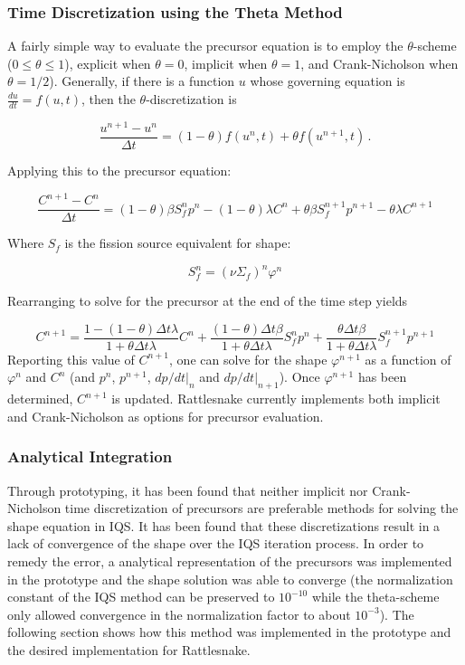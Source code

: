 \documentclass[12pt]{scrartcl}
\newcommand{\be}{\begin{equation}}
\newcommand{\ee}{\end{equation}}
\begin{document}
\subsubsection{Time Discretization using the Theta Method}

A fairly simple way to evaluate the precursor equation is to employ the $\theta$-scheme ($0\le\theta\le1$),
explicit when $\theta=0$, implicit when $\theta=1$, and Crank-Nicholson when $\theta=1/2$).
Generally, if there is a function $u$ whose governing equation is $\frac{du}{dt}=f(u,t)$,
then the $\theta$-discretization is

\be
\frac{u^{n+1}-u^n}{\Delta t}=(1-\theta)f(u^n,t) + \theta f(u^{n+1},t) \,.
\ee

Applying this to the precursor equation:

\be
\frac{C^{n+1}-C^n}{\Delta t}=(1-\theta)\beta S_f^np^n-(1-\theta)\lambda C^n + \theta\beta S_f^{n+1}p^{n+1}-\theta\lambda C^{n+1}
\ee

Where $S_f$ is the fission source equivalent for shape:

\be
S_f^n=(\nu\Sigma_f)^n\varphi^n
\ee

Rearranging to solve for the precursor at the end of the time step yields

\be
C^{n+1} = \frac{1-(1-\theta)\Delta t\lambda}{1+\theta\Delta t\lambda}C^n + \frac{(1-\theta)\Delta t \beta}{1+\theta\Delta t\lambda}S_f^n p^n +  \frac{\theta\Delta t \beta}{1+\theta\Delta t\lambda}S_f^{n+1} p^{n+1}
\ee
Reporting this value of $C^{n+1}$, one can solve for the shape $\varphi^{n+1}$ as a function of $\varphi^n$ and $C^n$
(and $p^n$, $p^{n+1}$, $dp/dt|_n$ and  $dp/dt|_{n+1}$).
Once $\varphi^{n+1}$ has been determined, $C^{n+1}$ is updated. Rattlesnake currently implements both implicit and Crank-Nicholson as options for precursor evaluation.


\subsubsection{Analytical Integration}

Through prototyping, it has been found that neither implicit nor Crank-Nicholson time discretization of precursors are preferable methods for solving the shape equation in IQS.  It has been found that these discretizations result in a lack of convergence of the shape over the IQS iteration process.  In order to remedy the error, a analytical representation of the precursors was implemented in the prototype and the shape solution was able to converge (the normalization constant of the IQS method can be preserved to $10^{-10}$ while the theta-scheme only allowed convergence in the normalization factor to about $10^{-3}$).  The following section shows how this method was implemented in the prototype and the desired implementation for Rattlesnake.
\end{document}
